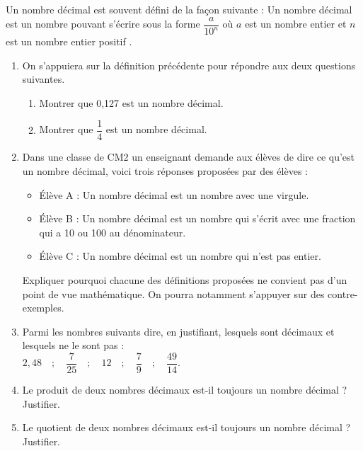\begin{exercice} %
   Un nombre décimal est souvent défini de la façon suivante : \og Un nombre décimal est un nombre pouvant s’écrire sous la forme $\dfrac{a}{10^n}$ où $a$ est un nombre entier et $n$ est un nombre entier positif \fg. \smallskip
   \begin{enumerate}
      \item On s’appuiera sur la définition précédente pour répondre aux deux questions suivantes.
         \begin{enumerate}
            \item Montrer que 0,127 est un nombre décimal. \smallskip
            \item Montrer que $\dfrac14$ est un nombre décimal. \smallskip
         \end{enumerate}
      \item Dans une classe de CM2 un enseignant demande aux élèves de dire ce qu’est un nombre décimal, voici trois réponses proposées par des élèves :
         \begin{itemize}
            \item Élève A : \og Un nombre décimal est un nombre avec une virgule. \fg
            \item Élève B : \og Un nombre décimal est un nombre qui s’écrit avec une fraction qui a 10 ou 100 au dénominateur. \fg
            \item Élève C : \og Un nombre décimal est un nombre qui n’est pas entier. \fg
         \end{itemize}
         Expliquer pourquoi chacune des définitions proposées ne convient pas d’un point de vue mathématique. On pourra notamment s’appuyer sur des contre-exemples.
      \item Parmi les nombres suivants dire, en justifiant, lesquels sont décimaux et lesquels ne le sont pas : \\ [1mm]
         $2,48 \quad ; \quad \dfrac{7}{25} \quad ; \quad 12 \quad ; \quad \dfrac79 \quad ; \quad \dfrac{49}{14}$. \smallskip
      \item Le produit de deux nombres décimaux est-il toujours un nombre décimal ? Justifier.
      \item Le quotient de deux nombres décimaux est-il toujours un nombre décimal ? Justifier.
   \end{enumerate}
\end{exercice}

